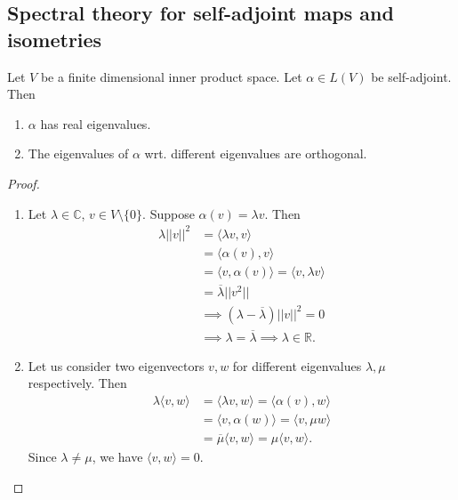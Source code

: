\documentclass[egregdoesnotlikesansseriftitles,a4paper]{scrartcl}
\begin{document}
\subsection{Spectral theory for self-adjoint maps and isometries}
\begin{lemma}
      Let $V$ be a finite dimensional inner product space. Let $\alpha \in L (V)$ be self-adjoint. Then
      \begin{enumerate}
           \item $\alpha $ has real eigenvalues.
           \item The eigenvalues of $\alpha$ wrt. different eigenvalues are orthogonal.
      \end{enumerate}
\end{lemma}
\begin{proof}
      \begin{enumerate}
           \item Let $\lambda \in \mathbb{C}$, $v \in V\setminus \{0\}$. Suppose $\alpha (v)= \lambda v$. Then 
           \begin{align*}
                \lambda ||v||^2&=\langle \lambda v,v \rangle\\
                &=\langle \alpha (v), v \rangle \\
                &=\langle v, \alpha (v) \rangle =\langle v,\lambda v \rangle \\&= \overline{\lambda} ||v^2||\\
                &\implies (\lambda-\overline{\lambda} )||v||^2=0\\
                &\implies \lambda=\overline{\lambda}  \implies \lambda \in \mathbb{R}.
           \end{align*}
           \item Let us consider two eigenvectors $v,w$ for different eigenvalues $\lambda, \mu $ respectively. Then
           \begin{align*}
                \lambda \langle v,w \rangle &=\langle \lambda v,w \rangle
                =\langle \alpha (v), w \rangle \\
                &=\langle v, \alpha (w) \rangle = \langle v, \mu w \rangle \\
                &=\overline{\mu} \langle v,w \rangle =\mu \langle v,w \rangle.
           \end{align*}
           Since $\lambda \neq \mu$, we have $\langle v,w \rangle =0$.
      \end{enumerate}
\end{proof}
\end{document}
